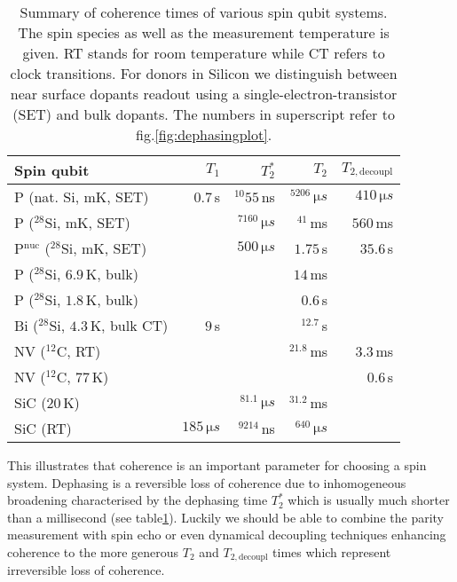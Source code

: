 \bgroup
\def\arraystretch{1.3}%
\begin{table}[H] 
	\footnotesize 
	\begin{tabular}{lrrrr}
		\hline
		Spin qubit & $T_1$ & $T_2^{*}$ & $T_2$ & $T_{2,\textrm{decoupl}}$ \\ \hline 
		P (nat. Si, mK, SET) \cite{Pla2012}& $0.7\, $s & $^{10}55\, $ns  & $^5206\, \si{\micro s}$ & $410\, \si{\micro s}$  \\
		P ($^{28}$Si, mK, SET) \cite{Muhonen2014}&  & $^7160\, \si{\micro s}$  & $^41\, $ms & $560\, $ms \\
		P$^{\text{nuc}}$ ($^{28}$Si, mK, SET) \cite{Muhonen2014}& & $500\, \si{\micro s}$ & $1.75\, $s & $35.6\, $s \\
		P ($^{28}$Si, $6.9\, $K, bulk) \cite{Morley2010}& &  & $14\, $ms &  \\
		P ($^{28}$Si, $1.8\, $K, bulk) \cite{Tyryshkin2011}& &  & $0.6\, $s &  \\
		Bi ($^{28}$Si, $4.3\, $K, bulk CT) \cite{Wolfowicz2013} & $9\, $s &  & $^12.7\, $s &\\
		NV ($^{12}$C, RT) \cite{Balasubramanian2009,Bar-Gill2013} & & & $^21.8\, $ms & $3.3\, $ms \\
		NV ($^{12}$C, $77\, $K) \cite{Bar-Gill2013} & & &  & $0.6\, $s \\
		SiC ($20\, $K) \cite{Christle2014} & & $^81.1\, \si{\micro s}$ & $^31.2\, $ms &  \\
		SiC (RT) \cite{Koehl2011} & $185\, \si{\micro s}$ & $^9214\, $ns & $^640\, \si{\micro s}$ &   \\
		\hline
	\end{tabular} 
	\caption{Summary of coherence times of various spin qubit systems. The spin species as well as the measurement temperature is given. RT stands for room temperature while CT refers to clock transitions. For donors in Silicon we distinguish between near surface dopants readout using a single-electron-transistor (SET) and bulk dopants. The numbers in superscript refer to fig.\@ \ref{fig:dephasingplot}.}
	\label{TAB:qubits}
\end{table}
\egroup




This illustrates that coherence is an important parameter for choosing a spin system. Dephasing is a reversible loss of coherence due to inhomogeneous broadening characterised by the dephasing time $T_2^*$ which is usually much shorter than a millisecond (see table\@ \ref{TAB:qubits}). Luckily we should be able to combine the parity measurement with spin echo or even dynamical decoupling techniques enhancing coherence to the more generous $T_2$ and $T_{2,\textrm{decoupl}}$ times which represent irreversible loss of coherence.

